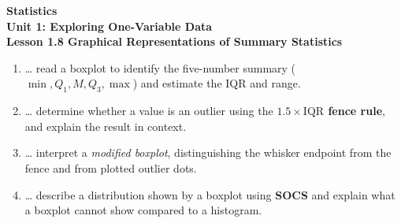 \documentclass[10pt]{article}
\begin{document}
\vspace{-0.8in}

\begin{center}
  {\color{white}\textbf{\LARGE Statistics}}\\[4pt]
  {\color{skymid}\large\textbf{Unit 1: Exploring One-Variable Data}}\\[6pt]
  {\color{white}\textbf{\large Lesson 1.8 \quad Graphical Representations of Summary Statistics}}
\end{center}

\vspace{0.22in}

\namedateperiod

\vspace{0.18in}

\begin{learningtargetbox}
\small
\begin{enumerate}[leftmargin=1.5em, itemsep=5pt]
  \item \ldots{} read a boxplot to identify the five-number summary
        ($\min, Q_1, M, Q_3, \max$) and estimate the IQR and range.
  \item \ldots{} determine whether a value is an outlier using the
        \textbf{$1.5 \times \text{IQR}$ fence rule}, and explain the result in context.
  \item \ldots{} interpret a \textit{modified boxplot}, distinguishing the
        whisker endpoint from the fence and from plotted outlier dots.
  \item \ldots{} describe a distribution shown by a boxplot using \textbf{SOCS}
        and explain what a boxplot cannot show compared to a histogram.
\end{enumerate}
\end{learningtargetbox}

\vspace{0.14in}
\end{document}
